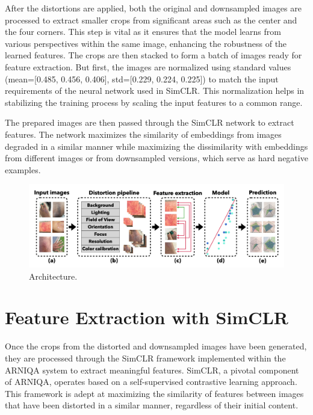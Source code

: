\noindent
After the distortions are applied, both the original and downsampled images are processed to extract smaller crops from significant areas such as the center and the four corners. This step is vital as it ensures that the model learns from various perspectives within the same image, enhancing the robustness of the learned features. The crops are then stacked to form a batch of images ready for feature extraction. But first, the images are normalized using standard values (mean=[0.485, 0.456, 0.406], std=[0.229, 0.224, 0.225])  to match the input requirements of the neural network used in SimCLR. This normalization helps in stabilizing the training process by scaling the input features to a common range. \par
\vspace{\baselineskip}
\noindent
The prepared images are then passed through the SimCLR network to extract features. The network maximizes the similarity of embeddings from images degraded in a similar manner while maximizing the dissimilarity with embeddings from different images or from downsampled versions, which serve as hard negative examples. \par

\begin{figure}[ht]
    \centering
    \includegraphics[keepaspectratio,width=15cm]{img/Architecture.jpg}
    \caption{Architecture.}
    \label{fig:Architecture}
\end{figure}

\section{Feature Extraction with SimCLR}
\label{sec:FeatureExtraction}
Once the crops from the distorted and downsampled images have been generated, they are processed through the SimCLR framework implemented within the ARNIQA system to extract meaningful features. SimCLR, a pivotal component of ARNIQA, operates based on a self-supervised contrastive learning approach. This framework is adept at maximizing the similarity of features between images that have been distorted in a similar manner, regardless of their initial content. \par


